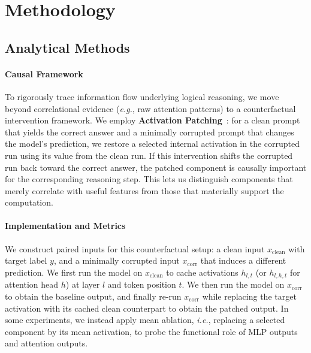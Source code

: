 \documentclass[11pt]{article}
\begin{document}
\section{Methodology}
\label{sec:methodology}

\subsection{Analytical Methods}
\label{sec:analytical_methods}

\paragraph{Causal Framework}
To rigorously trace information flow underlying logical reasoning, we move beyond correlational evidence (\textit{e.g.}, raw attention patterns) to a counterfactual intervention framework. We employ \textbf{Activation Patching}~\citep{vig2020causalinterpretingneuralNLP, meng2023locatingeditingfactualassociations}: for a clean prompt that yields the correct answer and a minimally corrupted prompt that changes the model's prediction, we restore a selected internal activation in the corrupted run using its value from the clean run. If this intervention shifts the corrupted run back toward the correct answer, the patched component is causally important for the corresponding reasoning step. This lets us distinguish components that merely correlate with useful features from those that materially support the computation.


\paragraph{Implementation and Metrics}
We construct paired inputs for this counterfactual setup: a clean input $x_{\text{clean}}$ with target label $y$, and a minimally corrupted input $x_{\text{corr}}$ that induces a different prediction. We first run the model on $x_{\text{clean}}$ to cache activations $h_{l,t}$ (or $h_{l,h,t}$ for attention head $h$) at layer $l$ and token position $t$. We then run the model on $x_{\text{corr}}$ to obtain the baseline output, and finally re-run $x_{\text{corr}}$ while replacing the target activation with its cached clean counterpart to obtain the patched output. In some experiments, we instead apply mean ablation, \textit{i.e.}, replacing a selected component by its mean activation, to probe the functional role of MLP outputs and attention outputs.
\end{document}
